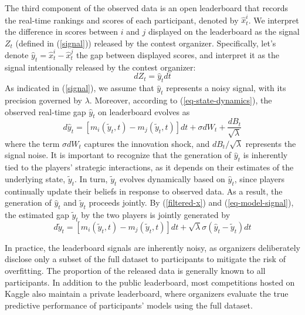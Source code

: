 \documentclass[mnsc]{informs3}
\begin{document}
The third component of the observed data is an open leaderboard that records the real-time rankings and scores of each participant, denoted by $\hat{x}^i_t$. 
We interpret the difference in scores between $i$ and $j$ displayed on the leaderboard as the signal $Z_t$ (defined in (\ref{signal})) released by the contest organizer. 
Specifically, let's denote $\hat{y}_t = \hat{x}^i_t - \hat{x}^j_t$ the gap between displayed scores, and interpret it as the signal intentionally released by the contest organizer: 
\begin{equation}\label{eq-model-signal}
dZ_t = \hat{y}_tdt
\end{equation}
As indicated in (\ref{signal}), we assume that $\hat{y}_t$ represents a noisy signal, with its precision governed by $\lambda$.
Moreover, according to (\ref{eq-state-dynamics}), the observed real-time gap $\hat{y}_t$ on leaderboard evolves as 
\begin{equation}\label{eq-leaderboard-gap}
d\hat{y}_t = \left[m_i(\tilde{y}_t, t) - m_j(\tilde{y}_t, t)\right]dt + \sigma dW_{t} + \frac{dB_t}{\sqrt{\lambda}}
\end{equation}
where the term $\sigma dW_t$ captures the innovation shock, and $dB_t/\sqrt{\lambda}$ represents the signal noise.
It is important to recognize that the generation of $\hat{y}_t$ is inherently tied to the players’ strategic interactions, as it depends on their estimates of the underlying state, $\tilde{y}_t$. 
In turn, $\tilde{y}_t$ evolves dynamically based on $\hat{y}_t$, since players continually update their beliefs in response to observed data. 
As a result, the generation of $\hat{y}_t$ and $\tilde{y}_t$ proceeds jointly.
By (\ref{filtered-x}) and (\ref{eq-model-signal}), the estimated gap $\tilde{y}_t$ by the two players is jointly generated by 
\begin{equation}\label{eq-fintered-y-update}
d\tilde{y}_{t} = \left[m_i(\tilde{y}_t, t) - m_j(\tilde{y}_t, t)\right]dt + \sqrt{\lambda}\sigma(\hat{y}_t-\tilde{y}_{t}) dt
\end{equation}

In practice, the leaderboard signals are inherently noisy, as organizers deliberately disclose only a subset of the full dataset to participants to mitigate the risk of overfitting. 
The proportion of the released data is generally known to all participants.
In addition to the public leaderboard, most competitions hosted on Kaggle also maintain a private leaderboard, where organizers evaluate the true predictive performance of participants’ models using the full dataset.
\end{document}
